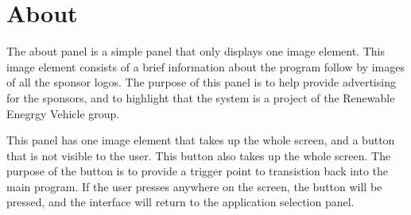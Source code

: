 

\section{About}
\label{sec:screenabout}
The about panel is a simple panel that only displays one image element. This image element consists of a brief information about the program follow by images of all the sponsor logos. The purpose of this panel is to help provide advertising for the sponsors, and to highlight that the system is a project of the Renewable Enegrgy Vehicle group.

This panel has one image element that takes up the whole screen, and a button that is not visible to the user. This button also takes up the whole screen. The purpose of the button is to provide a trigger point to transistion back into the main program. If the user presses anywhere on the screen, the button will be pressed, and the interface will return to the application selection panel.




